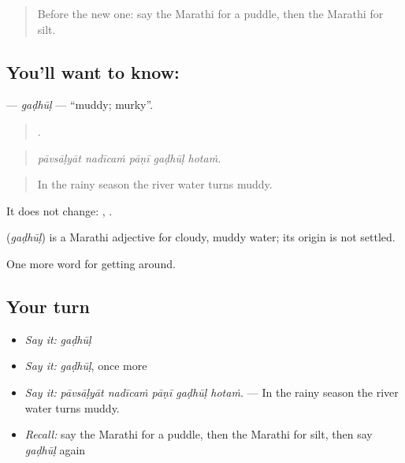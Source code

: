 \label{lesson:MR-C444-gadhul}



\begin{quote}
Before the new one: say the Marathi for a puddle, then the Marathi for silt.
\end{quote}

\subsection*{You'll want to know: }
\textbf{} — \emph{gaḍhūḷ} — \textquotedblleft{}muddy; murky\textquotedblright{}.

\begin{quote}
    .
\end{quote}

\begin{quote}
\emph{pāvsāḷyāt nadīcaṁ pāṇī gaḍhūḷ hotaṁ.}
\end{quote}

\begin{quote}
In the rainy season the river water turns muddy.
\end{quote}

It does not change:  ,  .

\begin{cousinweb}
\textbf{} (\emph{gaḍhūḷ}) is a Marathi adjective for cloudy, muddy water; its origin is not settled.
\end{cousinweb}

\begin{grammarlens}[title={What you've built}]
One more word for getting around.
\end{grammarlens}

\subsection*{Your turn}
\begin{itemize}
\raggedright
  \item \emph{Say it:} \emph{gaḍhūḷ}
  \item \emph{Say it:} \emph{gaḍhūḷ}, once more
  \item \emph{Say it:} \emph{pāvsāḷyāt nadīcaṁ pāṇī gaḍhūḷ hotaṁ.} — In the rainy season the river water turns muddy.
  \item \emph{Recall:} say the Marathi for a puddle, then the Marathi for silt, then say \emph{gaḍhūḷ} again
\end{itemize}

